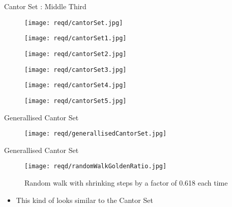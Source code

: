\documentclass{beamer}
\begin{document}
\begin{frame}{Cantor Set : Middle Third}
	\begin{figure}
    		\centering
    		\texttt{[image: reqd/cantorSet.jpg]}
	\end{figure}
	\pause
	\begin{figure}
    		\centering
    		\texttt{[image: reqd/cantorSet1.jpg]}
	\end{figure}
	\pause
	\begin{figure}
    		\centering
    		\texttt{[image: reqd/cantorSet2.jpg]}
	\end{figure}
	\pause
	\begin{figure}
    		\centering
    		\texttt{[image: reqd/cantorSet3.jpg]}
	\end{figure}
	\pause
	\begin{figure}
    		\centering
    		\texttt{[image: reqd/cantorSet4.jpg]}
	\end{figure}
	\pause
	\begin{figure}
    		\centering
    		\texttt{[image: reqd/cantorSet5.jpg]}
	\end{figure}
\end{frame}

\begin{frame}{Generallised Cantor Set}
	\begin{figure}
    		\centering
    		\texttt{[image: reqd/generallisedCantorSet.jpg]}
	\end{figure}
\end{frame}

\begin{frame}{Generallised Cantor Set}
	\begin{figure}
    		\centering
    		\texttt{[image: reqd/randomWalkGoldenRatio.jpg]}
    		\caption{Random walk with shrinking steps by a factor of 0.618 each time}
	\end{figure}

	\begin{itemize}
		\item{This kind of looks similar to the Cantor Set}
	\end{itemize}
\end{frame}
\end{document}
